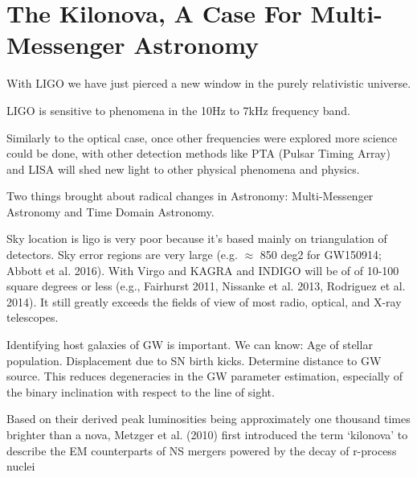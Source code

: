 \chapter{The Kilonova, A Case For Multi-Messenger Astronomy}


With LIGO we have just pierced a new window in the purely relativistic universe.

LIGO is sensitive to phenomena in the 10Hz to 7kHz frequency band.

Similarly to the optical case, once other frequencies were explored more science could be done, with other detection methods like PTA (Pulsar Timing Array) and LISA will shed new light to other physical phenomena and physics.

Two things brought about radical changes in Astronomy: Multi-Messenger Astronomy and Time Domain Astronomy.

Sky location is ligo is very poor because it's based mainly on triangulation of detectors.
	Sky error regions are very large (e.g. $\approx$ 850 deg2 for GW150914; Abbott et al. 2016).
	With Virgo and KAGRA and INDIGO will be of of 10-100 square degrees or less (e.g., Fairhurst 2011, Nissanke et al. 2013, Rodriguez et al. 2014). 
	It still greatly exceeds the fields of view of most radio, optical, and X-ray telescopes.

Identifying host galaxies of GW is important. We can know:
	Age of stellar population.
	Displacement due to SN birth kicks.
	Determine distance to GW source. This reduces degeneracies in the GW parameter estimation, especially of the binary inclination with respect to the line of sight.

Based on their derived peak luminosities being approximately one thousand times brighter than a nova, Metzger et al. (2010) first introduced the term `kilonova' to describe the EM counterparts of NS mergers powered by the decay of r-process nuclei


